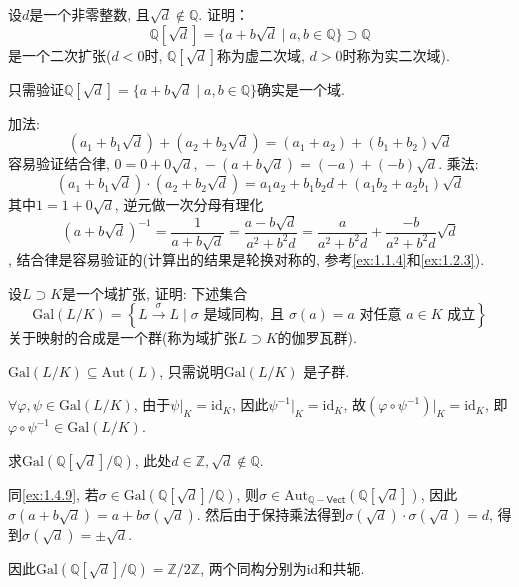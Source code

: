 \begin{problem}
    设$d$是一个非零整数, 且$\sqrt d \notin \mathbb{Q}$. 证明：
\[
    \mathbb{Q}[\sqrt{d}] = \{a + b\sqrt{d} \mid a, b \in \mathbb{Q}\} \supset \mathbb{Q}
\]
是一个二次扩张($d < 0$时, $\mathbb{Q}[\sqrt{d}]$称为虚二次域, $d > 0$时称为实二次域).
\end{problem}

\begin{solution}
    只需验证$\mathbb{Q}[\sqrt{d}] = \{a + b\sqrt{d} \mid a, b \in \mathbb{Q}\}$确实是一个域.
    
    加法:
    \[
        (a_1 + b_1\sqrt{d}) + (a_2 + b_2\sqrt{d}) = (a_1 + a_2) + (b_1 + b_2)\sqrt{d}
    \]
    容易验证结合律, $0 = 0 + 0\sqrt{d},\, -(a + b\sqrt{d}) = (-a) + (-b)\sqrt{d}$.
    乘法:
    \[
        (a_1 + b_1\sqrt{d}) \cdot (a_2 + b_2\sqrt{d}) = a_1a_2 + b_1b_2d + (a_1b_2 + a_2b_1)\sqrt{d}
    \]
    其中$1 = 1 + 0\sqrt{d}$, 逆元做一次分母有理化
    \[
        (a + b\sqrt{d})^{-1} = \frac{1}{a + b\sqrt{d}} = \frac{a - b\sqrt{d}}{a^2 + b^2d} = \frac{a}{a^2 + b^2d} + \frac{- b}{a^2 + b^2d}\sqrt{d}
    \],
    结合律是容易验证的(计算出的结果是轮换对称的, 参考\ref{ex:1.1.4}和\ref{ex:1.2.3}).
\end{solution}

\begin{problem}
    设$L \supset K$是一个域扩张, 证明: 下述集合
\[
\mathrm{Gal}(L/K)=
\left\{L \xrightarrow{\sigma} L \mid \sigma\text{ 是域同构},\text{ 且 } \sigma(a) = a \text{ 对任意 } a \in K \text{ 成立}\right\}
\]
关于映射的合成是一个群(称为域扩张$L\supset K$的伽罗瓦群).
\end{problem}

\begin{solution}
    $\mathrm{Gal}(L/K) \subseteq \mathrm{Aut}(L)$, 只需说明$\mathrm{Gal}(L/K)$
是子群.

    $\forall \varphi, \psi \in \mathrm{Gal}(L/K)$, 由于$\psi|_K = \mathrm{id}_K$,
因此$\psi^{-1}|_K = \mathrm{id}_K$, 故$(\varphi \circ \psi^{-1})|_K = \mathrm{id}_K$,
即$\varphi \circ \psi^{-1} \in \mathrm{Gal}(L/K)$.
\end{solution}

\begin{problem}
    求$\mathrm{Gal}\left(\mathbb{Q}[\sqrt{d}]/\mathbb{Q}\right)$,
此处$d \in \mathbb{Z}, \sqrt{d} \notin \mathbb{Q}$.
\end{problem}

\begin{solution}
    同\ref{ex:1.4.9}, 若$\sigma \in \mathrm{Gal}\left(\mathbb{Q}[\sqrt{d}]/\mathbb{Q}\right)$, 则$\sigma \in \mathrm{Aut}_{\mathbb{Q}-\mathsf{Vect}}\left(\mathbb{Q}[\sqrt{d}]\right)$, 因此$\sigma(a + b\sqrt{d}) = a + b\sigma(\sqrt{d})$. 然后由于保持乘法得到$\sigma(\sqrt{d}) \cdot \sigma(\sqrt{d}) = d$, 得到$\sigma(\sqrt{d}) = \pm\sqrt{d}$.

    因此$\mathrm{Gal}\left(\mathbb{Q}[\sqrt{d}]/\mathbb{Q}\right) = \mathbb{Z}/2\mathbb{Z}$,
    两个同构分别为$\mathrm{id}$和共轭.
\end{solution}

